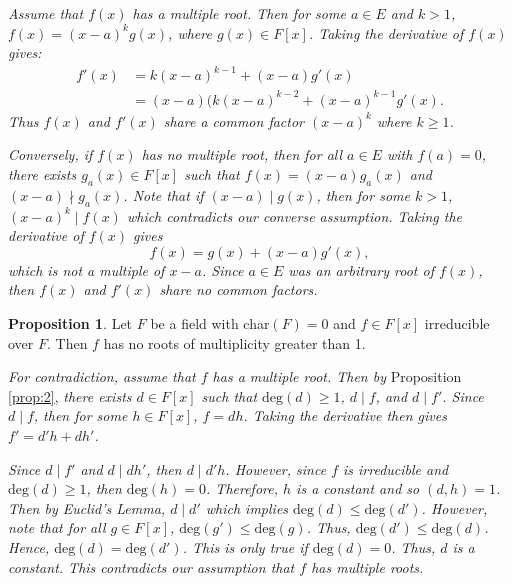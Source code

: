 \documentclass[leqno]{article}
\makeatletter
\theoremstyle{definition}
\newtheorem{prop}{Proposition}
\theoremstyle{remark}
\let\oldproofname=\proofname
\renewcommand{\proofname}{\textit{\oldproofname}}
\theoremstyle{definition}
\renewenvironment{proof}[1][\proofname]{\par
  \pushQED{\qed}%
  \normalfont \topsep6\p@\@plus6\p@\relax
  \list{}{\leftmargin=0mm
          \rightmargin=0mm
          \settowidth{\itemindent}{\itshape#1}%
          \labelwidth=\itemindent
          \parsep=0pt \listparindent=0mm%
  }
  \item[\hskip\labelsep
        \itshape
    #1\@addpunct{.}]\ignorespaces
}{%
  \popQED\endlist\@endpefalse
}
\makeatother
\begin{document}
        \begin{proof}
            \emph{Assume that $f(x)$ has a multiple root. Then for some $a\in E$ and $k>1$, $f(x)=(x-a)^kg(x)$, where $g(x)\in F[x]$. Taking the derivative of $f(x)$ gives:
                \begin{equation*}
                    \begin{split}
                        f'(x)&=k(x-a)^{k-1}+(x-a)g'(x) \\
                        &= (x-a)(k(x-a)^{k-2}+(x-a)^{k-1}g'(x).
                    \end{split}
                \end{equation*}
                Thus $f(x)$ and $f'(x)$ share a common factor $(x-a)^k$ where $k\geq 1$.}\par\hspace{4mm}
            \emph{Conversely, if $f(x)$ has no multiple root, then for all $a\in E$ with $f(a)=0$, there exists $g_a(x)\in F[x]$ such that $f(x)=(x-a)g_a(x)$ and $(x-a)\nmid g_a(x)$. Note that if $(x-a)\mid g(x)$, then for some $k>1$, $(x-a)^k\mid f(x)$ which contradicts our converse assumption. Taking the derivative of $f(x)$ gives
                \begin{equation*}
                    f(x)=g(x)+(x-a)g'(x),
                \end{equation*}
            which is not a multiple of $x-a$. Since $a\in E$ was an arbitrary root of $f(x)$, then $f(x)$ and $f'(x)$ share no common factors.
                }
        \end{proof}
    \begin{prop}\label{prop:4}
        Let $F$ be a field with char$(F)=0$ and $f\in F[x]$ irreducible over $F$. Then $f$ has no roots of multiplicity greater than 1.
    \end{prop}
        \begin{proof}
            \emph{For contradiction, assume that $f$ has a multiple root. Then by} Proposition \ref{prop:2}, \emph{there exists $d\in F[x]$ such that $\text{deg}(d)\geq 1$, $d\mid f$, and $d\mid f'$. Since $d\mid f$, then for some $h\in F[x]$, $f=dh$. Taking the derivative then gives $f'=d'h+dh'$.}\par\hspace{4mm}
            \emph{Since $d\mid f'$ and $d\mid dh'$, then $d\mid d'h$. However, since $f$ is irreducible and $\text{deg}(d)\geq 1$, then $\text{deg}(h)=0$. Therefore, $h$ is a constant and so $(d,h)=1$. Then by Euclid's Lemma, $d\mid d'$ which implies $\text{deg}(d)\leq\text{deg}(d')$. However, note that for all $g\in F[x]$, $\text{deg}(g')\leq\text{deg}(g)$. Thus, $\text{deg}(d')\leq\text{deg}(d)$. Hence, $\text{deg}(d)=\text{deg}(d')$. This is only true if $\text{deg}(d)=0$. Thus, $d$ is a constant. This contradicts our assumption that $f$ has multiple roots.}
        \end{proof}
\end{document}
